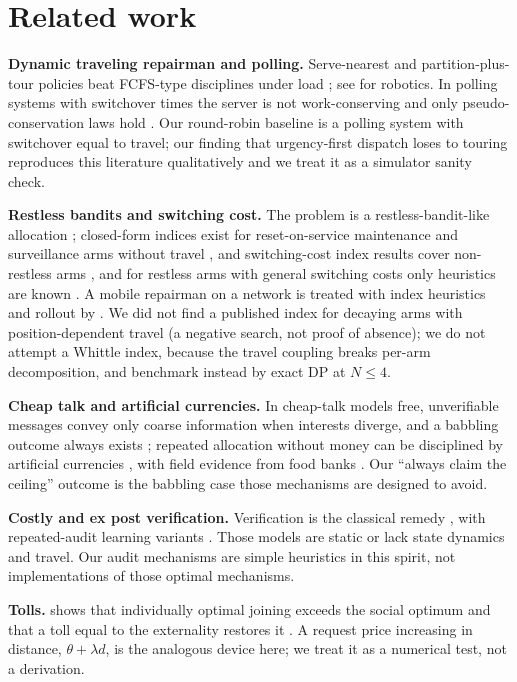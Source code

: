 \documentclass[10pt]{article}
\begin{document}
\section{Related work}
\textbf{Dynamic traveling repairman and polling.} Serve-nearest and partition-plus-tour policies beat FCFS-type disciplines under load \citep{bertsimas1991,bertsimas1993}; see \citet{bullo2011} for robotics. In polling systems with switchover times the server is not work-conserving and only pseudo-conservation laws hold \citep{boxma1987,takagi1988}. Our round-robin baseline is a polling system with switchover equal to travel; our finding that urgency-first dispatch loses to touring reproduces this literature qualitatively and we treat it as a simulator sanity check.

\textbf{Restless bandits and switching cost.} The problem is a restless-bandit-like allocation \citep{whittle1988,weber1990}; closed-form indices exist for reset-on-service maintenance and surveillance arms without travel \citep{glazebrook2006,villar2016}, and switching-cost index results cover non-restless arms \citep{asawa1996}, and for restless arms with general switching costs only heuristics are known \citep{leny2008}. A mobile repairman on a network is treated with index heuristics and rollout by \citet{tian2026}. We did not find a published index for decaying arms with position-dependent travel (a negative search, not proof of absence); we do not attempt a Whittle index, because the travel coupling breaks per-arm decomposition, and benchmark instead by exact DP at $N\le4$.

\textbf{Cheap talk and artificial currencies.} In cheap-talk models free, unverifiable messages convey only coarse information when interests diverge, and a babbling outcome always exists \citep{crawford1982}; repeated allocation without money can be disciplined by artificial currencies \citep{gorokh2021,guo2009,elokda2024}, with field evidence from food banks \citep{prendergast2022}. Our ``always claim the ceiling'' outcome is the babbling case those mechanisms are designed to avoid.

\textbf{Costly and ex post verification.} Verification is the classical remedy \citep{townsend1979,benporath2014,mylovanov2017}, with repeated-audit learning variants \citep{dai2025}. Those models are static or lack state dynamics and travel. Our audit mechanisms are simple heuristics in this spirit, not implementations of those optimal mechanisms.

\textbf{Tolls.} \citet{naor1969} shows that individually optimal joining exceeds the social optimum and that a toll equal to the externality restores it \citep[see also][]{hassin2003}. A request price increasing in distance, $\theta+\lambda d$, is the analogous device here; we treat it as a numerical test, not a derivation.
\end{document}
